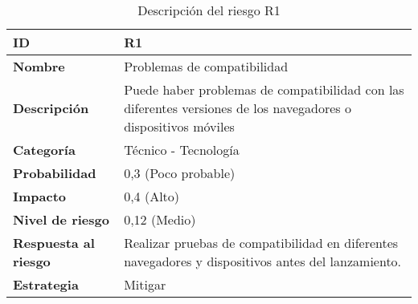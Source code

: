 \begin{table}[H]
	\centering
	\begin{tabular}{|l|m{12cm}|}
		\hline
		\textbf{ID}                  & R1                                                                                                             \\
		\hline
		\textbf{Nombre}              & Problemas de compatibilidad                                                                                    \\
		\hline
		\textbf{Descripción}         & Puede haber problemas de compatibilidad con las diferentes versiones de los navegadores o dispositivos móviles \\
		\hline
		\textbf{Categoría}           & Técnico - Tecnología                                                                                           \\
		\hline
		\textbf{Probabilidad}        & 0,3 (Poco probable)                                                                                            \\
		\hline
		\textbf{Impacto}             & 0,4 (Alto)                                                                                                     \\
		\hline
		\textbf{Nivel de riesgo}     & 0,12 (Medio)                                                                                                   \\
		\hline
		\textbf{Respuesta al riesgo} & Realizar pruebas de compatibilidad en diferentes navegadores y dispositivos antes del lanzamiento.             \\
		\hline
		\textbf{Estrategia}          & Mitigar                                                                                                        \\
		\hline
	\end{tabular}
	\caption{Descripción del riesgo R1}
\end{table}

\vspace{0.5cm}

